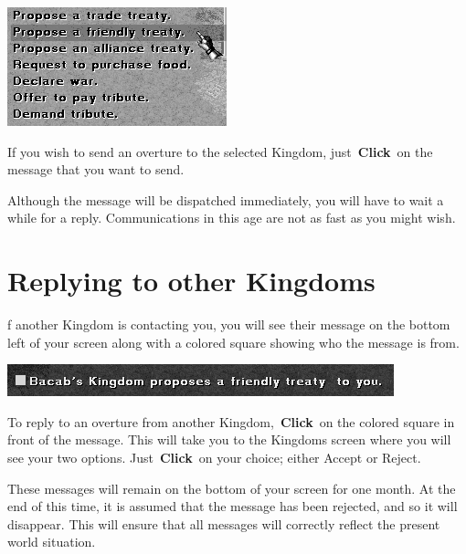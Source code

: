 
\begin{center}
	\includegraphics[width=0.7\linewidth]{Idimplomacy_propose}
\end{center}

If you wish to send an overture to the selected Kingdom, just \textbf{Click} on the message that you want to send.

Although the message will be dispatched immediately, you will have to wait a while for a reply. Communications in this age are not as fast as you might wish.

\section{Replying to other Kingdoms}


f another Kingdom is contacting you, you will see their message on the bottom left of your screen along with a colored square showing who the message is from.

\begin{center}
	\includegraphics[width=0.7\linewidth]{Imessage}
\end{center}

To reply to an overture from another Kingdom, \textbf{Click} on the colored square in front of the message. This will take you to the Kingdoms screen where you will see your two options. Just \textbf{Click} on your choice; either Accept or Reject.

These messages will remain on the bottom of your screen for one month. At the end of this time, it is assumed that the message has been rejected, and so it will disappear. This will ensure that all messages will correctly reflect the present world situation.

